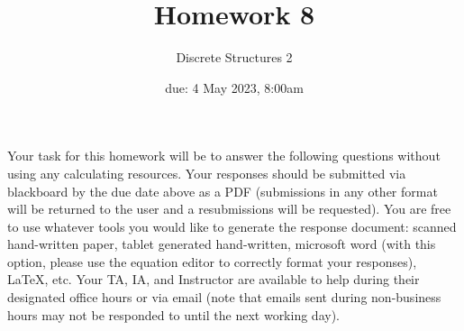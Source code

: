 \documentclass[11pt, oneside]{article}   	%
\title{Homework 8}
\author{Discrete Structures 2}
\date{due: 4 May 2023, 8:00am}							%
\begin{document}
\maketitle

Your task for this homework will be to answer the following questions without using any calculating resources. 
Your responses should be submitted via blackboard by the due date above as a PDF (submissions in any other format will be returned to the user and a resubmissions will be requested). 
You are free to use whatever tools you would like to generate the response document: 
scanned hand-written paper, 
tablet generated hand-written, 
microsoft word (with this option, please use the equation editor to correctly format your responses), 
\LaTeX, etc.
Your TA, IA, and Instructor are available to help during their designated office hours or via email 
(note that emails sent during non-business hours may not be responded to until the next working day). 
\end{document}
